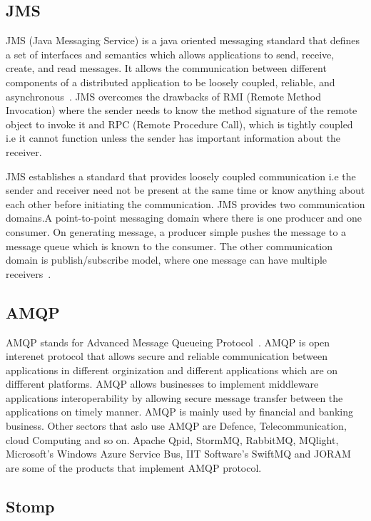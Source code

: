 \subsection{JMS}

JMS (Java Messaging Service) is a java oriented messaging standard
that defines a set of interfaces and semantics which allows
applications to send, receive, create, and read messages.  It allows
the communication between different components of a distributed
application to be loosely coupled, reliable, and
asynchronous~\cite{www-jms-wiki}. JMS overcomes the drawbacks of RMI
(Remote Method Invocation) where the sender needs to know the method
signature of the remote object to invoke it and RPC (Remote Procedure
Call), which is tightly coupled i.e it cannot function unless the
sender has important information about the receiver.

JMS establishes a standard that provides loosely coupled communication
i.e the sender and receiver need not be present at the same time or
know anything about each other before initiating the communication.
JMS provides two communication domains.A point-to-point messaging
domain where there is one producer and one consumer. On generating
message, a producer simple pushes the message to a message queue which
is known to the consumer. The other communication domain is
publish/subscribe model, where one message can have multiple
receivers~\cite{www-jms-oracle-docs}.

\subsection{AMQP}

AMQP stands for Advanced Message Queueing
Protocol~\cite{www-amqp}. AMQP is open interenet protocol that allows
secure and reliable communication between applications in different
orginization and different applications which are on diffferent
platforms. AMQP allows businesses to implement middleware applications
interoperability by allowing secure message transfer between the
applications on timely manner. AMQP is mainly used by financial and
banking business. Other sectors that aslo use AMQP are Defence,
Telecommunication, cloud Computing and so on.  Apache Qpid, StormMQ,
RabbitMQ, MQlight, Microsoft's Windows Azure Service Bus, IIT
Software's SwiftMQ and JORAM are some of the products that implement
AMQP protocol.

     \pv

\subsection{Stomp}

